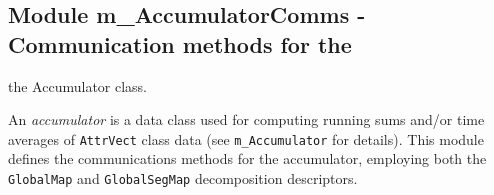  
\parskip        0pt
\parindent      0pt
\baselineskip  11pt
 
\def\bv{\begin{verbatim}}
\def\ev{\end{verbatim}}
\def\be{\begin{equation}}
\def\ee{\end{equation}}
\def\bea{\begin{eqnarray}}
\def\eea{\end{eqnarray}}
\def\bi{\begin{itemize}}
\def\ei{\end{itemize}}
\def\bn{\begin{enumerate}}
\def\en{\end{enumerate}}
\def\bd{\begin{description}}
\def\ed{\end{description}}
\def\({\left (}
\def\){\right )}
\def\[{\left [}
\def\]{\right ]}
\def\<{\left  \langle}
\def\>{\right \rangle}
\def\cI{{\cal I}}
\def\diag{\mathop{\rm diag}}
\def\tr{\mathop{\rm tr}}
 

 \subsection{Module m\_AccumulatorComms - Communication methods for the }


           the Accumulator class.
 
 
  An {\em accumulator} is a data class used for computing running sums 
  and/or time averages of {\tt AttrVect} class data (see 
  {\tt m\_Accumulator} for details).  This module defines the 
  communications methods for the accumulator, employing both the 
  {\tt GlobalMap} and {\tt GlobalSegMap} decomposition descriptors.
 
